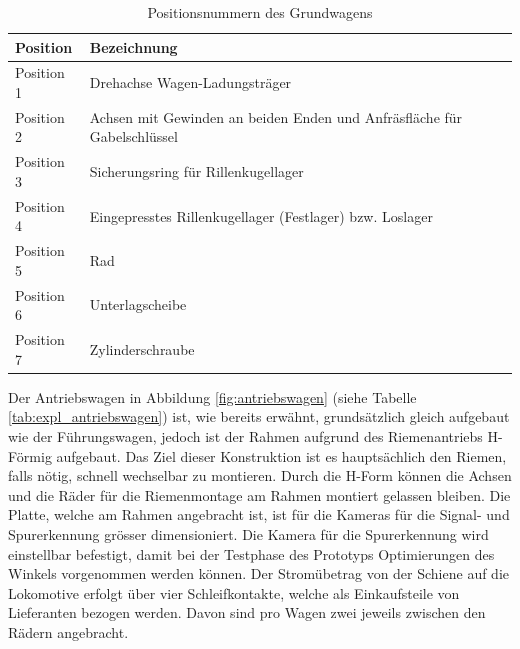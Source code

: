 \documentclass[../../main.tex]{subfiles}
\begin{document}
    \begin{table}[H] \centering
        \begin{tabular}{|l|l|}
        \hline
        \textbf{Position} & \textbf{Bezeichnung}\\
        \hline
        Position 1          & Drehachse Wagen-Ladungsträger\\
         \hline
        Position 2          & Achsen mit Gewinden an beiden Enden und Anfräsfläche für Gabelschlüssel\\
         \hline
        Position 3          & Sicherungsring für Rillenkugellager\\
        \hline
        Position 4          & Eingepresstes Rillenkugellager (Festlager) bzw. Loslager\\
        \hline
        Position 5          & Rad\\
        \hline
        Position 6          & Unterlagscheibe\\
        \hline
        Position 7          & Zylinderschraube\\
        \hline
        \end{tabular}

        \caption{Positionsnummern des Grundwagens}
        \label{tab:expl_fuehrungswagen}
        \end{table}
    \newpage

    Der Antriebswagen in Abbildung \ref{fig:antriebswagen} (siehe Tabelle \ref{tab:expl_antriebswagen}) ist, wie bereits erwähnt, grundsätzlich gleich aufgebaut wie der Führungswagen, jedoch ist der Rahmen aufgrund des Riemenantriebs H-Förmig aufgebaut. Das Ziel dieser Konstruktion ist es hauptsächlich den Riemen, falls nötig, schnell wechselbar zu montieren. Durch die H-Form können die Achsen und die Räder für die Riemenmontage am Rahmen montiert gelassen bleiben. Die Platte, welche am Rahmen angebracht ist, ist für die Kameras für die Signal- und Spurerkennung grösser dimensioniert. Die Kamera für die Spurerkennung wird einstellbar befestigt, damit bei der Testphase des Prototyps Optimierungen des Winkels vorgenommen werden können. Der Stromübetrag von der Schiene auf die Lokomotive erfolgt über vier Schleifkontakte, welche als Einkaufsteile von Lieferanten bezogen werden. Davon sind pro Wagen zwei jeweils zwischen den Rädern angebracht.\\
\end{document}
